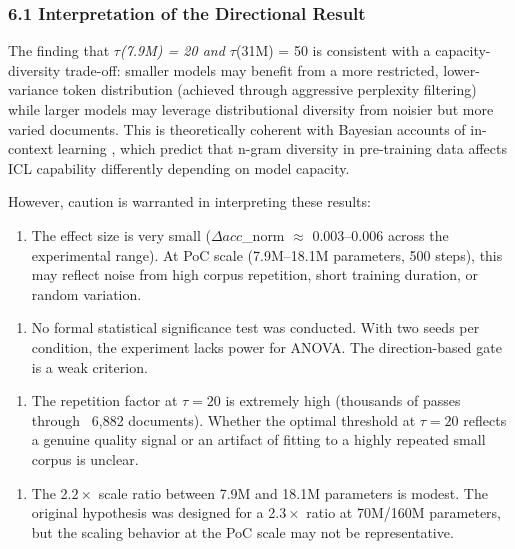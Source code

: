 
\subsubsection{6.1 Interpretation of the Directional Result}

The finding that $\tau$\textit{(7.9M) = 20 and $\tau$}(31M) = 50 is consistent with a capacity-diversity trade-off: smaller models may benefit from a more restricted, lower-variance token distribution (achieved through aggressive perplexity filtering) while larger models may leverage distributional diversity from noisier but more varied documents. This is theoretically coherent with Bayesian accounts of in-context learning \citep{Xie2021Explanation}, which predict that n-gram diversity in pre-training data affects ICL capability differently depending on model capacity.

However, caution is warranted in interpreting these results:

\begin{enumerate}
\item The effect size is very small ($\Delta acc$\_norm $\approx$ 0.003--0.006 across the experimental range). At PoC scale (7.9M--18.1M parameters, 500 steps), this may reflect noise from high corpus repetition, short training duration, or random variation.
\end{enumerate}

\begin{enumerate}
\item No formal statistical significance test was conducted. With two seeds per condition, the experiment lacks power for ANOVA. The direction-based gate is a weak criterion.
\end{enumerate}

\begin{enumerate}
\item The repetition factor at $\tau =20$ is extremely high (thousands of passes through ~6,882 documents). Whether the optimal threshold at $\tau =20$ reflects a genuine quality signal or an artifact of fitting to a highly repeated small corpus is unclear.
\end{enumerate}

\begin{enumerate}
\item The 2.$2\times$ scale ratio between 7.9M and 18.1M parameters is modest. The original hypothesis was designed for a 2.$3\times$ ratio at 70M/160M parameters, but the scaling behavior at the PoC scale may not be representative.
\end{enumerate}

